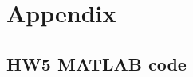 \documentclass[conf]{new-aiaa}
\begin{document}













\newpage
\section*{Appendix} 

\subsection*{HW5 MATLAB code} 









\end{document}
